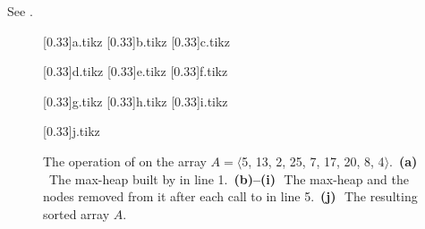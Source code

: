 See .
\begin{figure}[htb]
    \hspace*{-1.5cm}
    \newlength{\figurewidth}\setlength{\figurewidth}{\textwidth+1.5cm}
    \begin{minipage}{\figurewidth}
        \subcaptionbox{\label{fig:6.4-1a}}[0.33\figurewidth]{{a.tikz}}
        \subcaptionbox{\label{fig:6.4-1b}}[0.33\figurewidth]{{b.tikz}}
        \subcaptionbox{\label{fig:6.4-1c}}[0.33\figurewidth]{{c.tikz}}
        \par\vspace{1.5\vertexsize}
        \subcaptionbox{\label{fig:6.4-1d}}[0.33\figurewidth]{{d.tikz}}
        \subcaptionbox{\label{fig:6.4-1e}}[0.33\figurewidth]{{e.tikz}}
        \subcaptionbox{\label{fig:6.4-1f}}[0.33\figurewidth]{{f.tikz}}
        \par\vspace{1.5\vertexsize}
        \subcaptionbox{\label{fig:6.4-1g}}[0.33\figurewidth]{{g.tikz}}
        \subcaptionbox{\label{fig:6.4-1h}}[0.33\figurewidth]{{h.tikz}}
        \subcaptionbox{\label{fig:6.4-1i}}[0.33\figurewidth]{{i.tikz}}
        \par\vspace{1.5\vertexsize}
        \subcaptionbox{\label{fig:6.4-1j}}[0.33\figurewidth]{{j.tikz}}
    \end{minipage}
    \caption{The operation of  on the array $A=\langle$5, 13, 2, 25, 7, 17, 20, 8, 4$\rangle$.\,
    \textbf{(a)}\,~The max-heap built by  in line 1.\,
    \textbf{(b)--(i)}\,~The max-heap and the nodes removed from it after each call to  in line 5.\,
    \textbf{(j)}\,~The resulting sorted array $A$.} \label{fig:6.4-1}
\end{figure}
